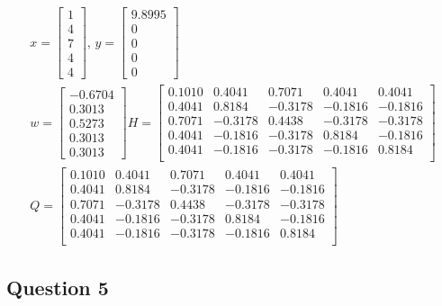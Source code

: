 \begin{eqnarray}
  x =
  \begin{bmatrix}
    1 \\
    4 \\
    7 \\
    4 \\
    4
  \end{bmatrix}
  \text{, }
  y = 
  \begin{bmatrix}
    9.8995 \\
    0 \\
    0 \\
    0 \\
    0
  \end{bmatrix}
  \\
  w = 
  \begin{bmatrix}
    -0.6704 \\
    0.3013 \\
    0.5273 \\
    0.3013 \\
    0.3013
  \end{bmatrix}
  H = 
  \begin{bmatrix}
    0.1010 &   0.4041 &   0.7071 &   0.4041 &   0.4041 \\
    0.4041 &   0.8184 &  -0.3178 &  -0.1816 &  -0.1816 \\
    0.7071 &  -0.3178 &   0.4438 &  -0.3178 &  -0.3178 \\
    0.4041 &  -0.1816 &  -0.3178 &   0.8184 &  -0.1816 \\
    0.4041 &  -0.1816 &  -0.3178 &  -0.1816 &   0.8184 \\
  \end{bmatrix}
  \\
  Q =
  \begin{bmatrix}
    0.1010 &   0.4041 &   0.7071 &   0.4041 &   0.4041 \\
    0.4041 &   0.8184 &  -0.3178 &  -0.1816 &  -0.1816 \\
    0.7071 &  -0.3178 &   0.4438 &  -0.3178 &  -0.3178 \\
    0.4041 &  -0.1816 &  -0.3178 &   0.8184 &  -0.1816 \\
    0.4041 &  -0.1816 &  -0.3178 &  -0.1816 &   0.8184 \\
  \end{bmatrix}
\end{eqnarray}

\newpage
\subsection{Question 5}



%
